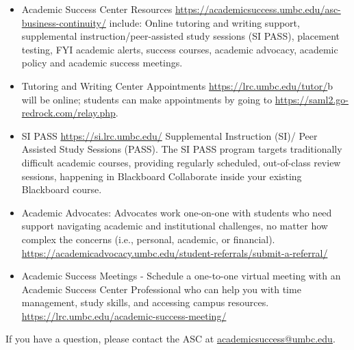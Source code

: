 \documentclass[letter,11pt]{article}
\begin{document}
\begin{itemize}
\item Academic Success Center Resources \url{https://academicsuccess.umbc.edu/asc-business-continuity/} include: Online tutoring and writing support, supplemental instruction/peer-assisted study sessions (SI PASS), placement testing, FYI academic alerts, success courses, academic advocacy, academic policy and academic success meetings.

\item Tutoring and Writing Center Appointments \url{https://lrc.umbc.edu/tutor/}b will be online; students can make appointments by going to \url{https://saml2.go-redrock.com/relay.php}.

\item SI PASS \url{https://si.lrc.umbc.edu/} Supplemental Instruction (SI)/ Peer Assisted Study Sessions (PASS). The SI PASS program targets traditionally difficult academic courses, providing regularly scheduled, out-of-class review sessions, happening in Blackboard Collaborate inside your existing Blackboard course.

\item Academic Advocates: Advocates work one-on-one with students who need support navigating academic and institutional challenges, no matter how complex the concerns (i.e., personal, academic, or financial). \url{https://academicadvocacy.umbc.edu/student-referrals/submit-a-referral/}

\item Academic Success Meetings - Schedule a one-to-one virtual meeting with an Academic Success Center Professional who can help you with time management, study skills, and accessing campus resources. \url{https://lrc.umbc.edu/academic-success-meeting/}

\end{itemize}

If you have a question, please contact the ASC at \href{mailto:academicsuccess@umbc.edu}{academicsuccess@umbc.edu}.

\end{document}
